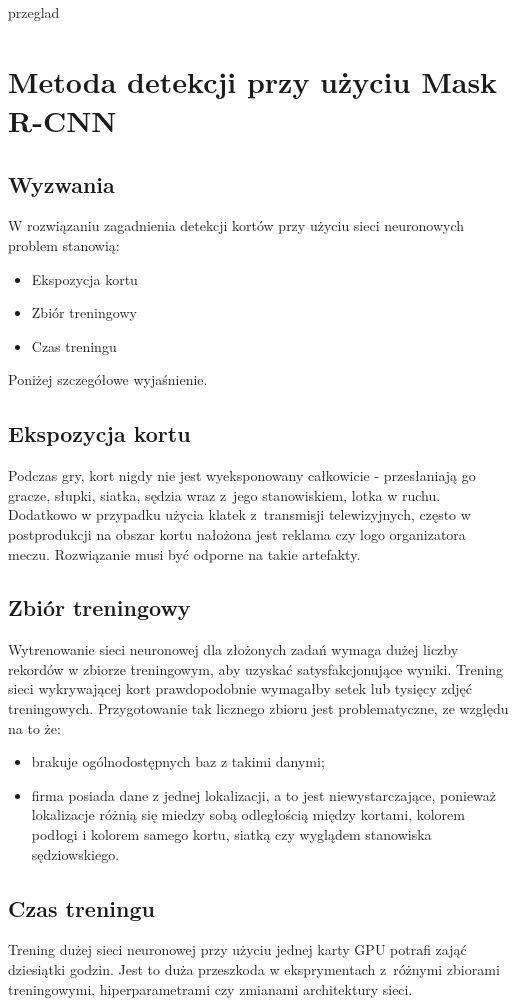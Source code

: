 
{przeglad}

\section{Metoda detekcji przy użyciu Mask R-CNN}

\subsection{Wyzwania}

W rozwiązaniu zagadnienia detekcji kortów przy użyciu sieci neuronowych problem stanowią:

\begin{itemize}
  \item Ekspozycja kortu
  \item Zbiór treningowy
  \item Czas treningu
\end{itemize}

Poniżej szczegółowe wyjaśnienie.

\subsection*{Ekspozycja kortu}

Podczas gry, kort nigdy nie jest wyeksponowany całkowicie - przesłaniają go gracze, słupki, siatka, sędzia wraz z~jego stanowiskiem, lotka w ruchu.
Dodatkowo w przypadku użycia klatek z~transmisji telewizyjnych, często w postprodukcji na obszar kortu nałożona jest reklama czy logo organizatora meczu.
Rozwiązanie musi być odporne na takie artefakty.

\subsection*{Zbiór treningowy}

Wytrenowanie sieci neuronowej dla złożonych zadań wymaga dużej liczby rekordów w zbiorze treningowym, aby uzyskać satysfakcjonujące wyniki.
Trening sieci wykrywającej kort prawdopodobnie wymagałby setek lub tysięcy zdjęć treningowych.
Przygotowanie tak licznego zbioru jest problematyczne, ze względu na to że:

\begin{itemize}
	\item brakuje ogólnodostępnych baz z takimi danymi;
	\item firma posiada dane z jednej lokalizacji, a to jest niewystarczające, ponieważ lokalizacje różnią się miedzy sobą odległością między kortami, kolorem podłogi i kolorem samego kortu, siatką czy wyglądem stanowiska sędziowskiego.
\end{itemize}

\subsection*{Czas treningu}

Trening dużej sieci neuronowej przy użyciu jednej karty GPU potrafi zająć dziesiątki godzin.
Jest to duża przeszkoda w eksprymentach z~różnymi zbiorami treningowymi, hiperparametrami czy zmianami architektury sieci.
